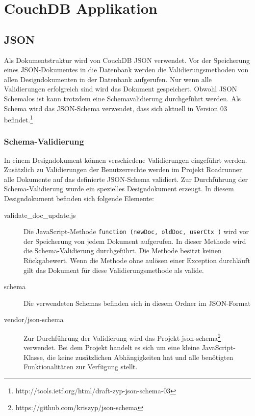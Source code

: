 \section{CouchDB Applikation}
\label{sec:couchdb}

\subsection{JSON}

Als Dokumentstruktur wird von CouchDB JSON verwendet. Vor der Speicherung eines JSON-Dokumentes in die Datenbank werden die Validierungsmethoden von allen Designdokumenten in der Datenbank aufgerufen. Nur wenn alle Validierungen erfolgreich sind wird das Dokument gespeichert. Obwohl JSON Schemalos ist kann trotzdem eine Schemavalidierung durchgeführt werden. Als Schema wird das JSON-Schema verwendet, dass sich aktuell in Version 03 befindet.\footnote{http://tools.ietf.org/html/draft-zyp-json-schema-03} 

\subsubsection{Schema-Validierung}

In einem Designdokument können verschiedene Validierungen eingeführt werden. Zusätzlich zu Validierungen der Benutzerrechte werden im Projekt Roadrunner alle Dokumente auf das definierte JSON-Schema validiert. 
Zur Durchführung der Schema-Validierung wurde ein spezielles Designdokument erzeugt. In diesem Designdokument befinden sich folgende Elemente:

\begin{description}
\item[validate\_doc\_update.js] Die JavaScript-Methode \texttt{function (newDoc, oldDoc, userCtx )} wird vor der Speicherung von jedem Dokument aufgerufen. In dieser Methode wird die Schema-Validierung durchgeführt. Die Methode besitzt keinen Rückgabewert. Wenn die Methode ohne aulösen einer Exception durchläuft gilt das Dokument für diese Validierungsmethode als valide.
\item[schema] Die verwendeten Schemas befinden sich in diesem Ordner im JSON-Format
\item[vendor/json-schema] Zur Durchführung der Validierung wird das Projekt json-schema\footnote{https://github.com/kriszyp/json-schema} verwendet. Bei dem Projekt handelt es sich um eine kleine JavaScript-Klasse, die keine zusätzlichen Abhängigkeiten hat und alle benötigten Funktionalitäten zur Verfügung stellt.
\end{description}

